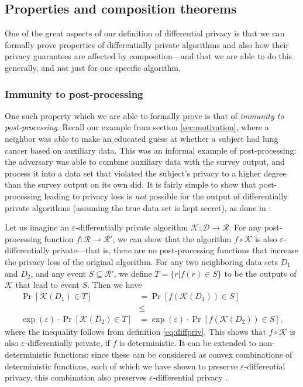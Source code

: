 \documentclass[a4paper,12pt]{article}
\newcommand{\fancy}{\mathcal}
\renewcommand{\epsilon}{\varepsilon}
\begin{document}
\subsection{Properties and composition theorems \label{sec:composition}}

One of the great aspects of our definition of differential privacy is that we can formally prove properties of differentially private algorithms and also how their privacy guarantees are affected by composition---and that we are able to do this generally, and not just for one specific algorithm.

\subsubsection{Immunity to post-processing}

One such property which we are able to formally prove is that of \emph{immunity to post-processing}. Recall our example from section \ref{sec:motivation}, where a neighbor was able to make an educated guess at whether a subject had lung cancer based on auxiliary data. This was an informal example of post-processing: the adversary was able to combine auxiliary data with the survey output, and process it into a data set that violated the subject's privacy to a higher degree than the survey output on its own did. It is fairly simple to show that post-processing leading to privacy loss is \emph{not} possible for the output of differentially private algorithms (assuming the true data set is kept secret), as done in \cite{dwork_privacybook}:

Let us imagine an $\epsilon$-differentially private algorithm $\fancy{K} : \fancy{D} \to \fancy{R}$. For any post-processing function $f : \fancy{R} \to \fancy{R}'$, we can show that the algorithm $f \circ \fancy{K}$ is also $\epsilon$-differentially private---that is, there are no post-processing functions that increase the privacy loss of the original algorithm. For any two neighboring data sets $D_1$ and $D_2$, and any event $S \subseteq \fancy{R}'$, we define $T = \{r|f(r) \in S\}$ to be the outputs of $\fancy{K}$ that lead to event $S$. Then we have
\begin{align*}
    \Pr[\fancy{K}(D_1) \in T] &= \Pr[f(\fancy{K}(D_1)) \in S]  \\
    &\leq \\
    \exp(\epsilon)\cdot\Pr[\fancy{K}(D_2) \in T] &= \exp(\epsilon)\cdot\Pr[f(\fancy{K}(D_2)) \in S],
\end{align*}
where the inequality follows from definition \ref{eq:diffpriv}. This shows that $f \circ \fancy{K}$ is also $\epsilon$-differentially private, if $f$ is deterministic. It can be extended to non-deterministic functions: since these can be considered as convex combinations of deterministic functions, each of which we have shown to preserve $\epsilon$-differential privacy, this combination also preserves $\epsilon$-differential privacy \cite[sec.~2.3]{dwork_privacybook}.
\end{document}
